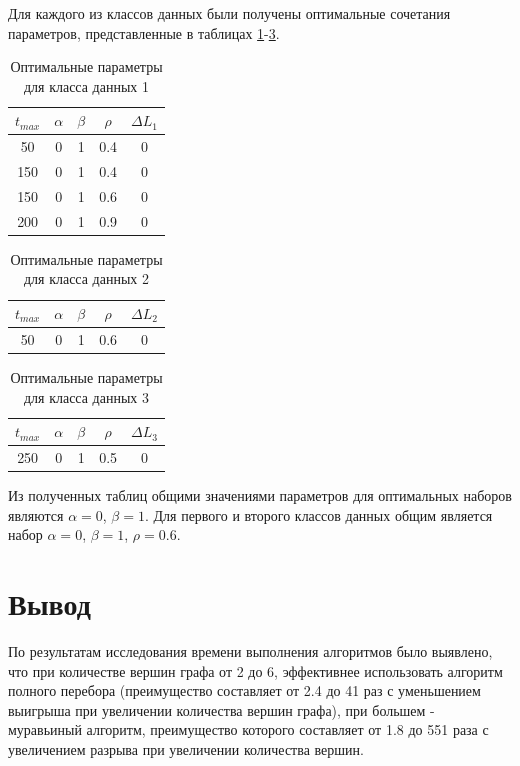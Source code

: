 \documentclass[a4paper,oneside,14pt]{extreport}
\begin{document}
Для каждого из классов данных были получены оптимальные сочетания параметров, представленные в таблицах \ref{tab:m1}-\ref{tab:m3}.

\begin{table}[H]
	\caption{Оптимальные параметры для класса данных 1}
	\label{tab:m1}
	\begin{center}
		\begin{tabular}{|c|c|c|c|c|}
			\hline
			$t_{max}$ & $\alpha$ & $\beta$ & $\rho$ & $\Delta L_{1}$\\
			\hline
			50&0&1&0.4&0\\
			150&0&1&0.4&0\\
			150&0&1&0.6&0\\
			200&0&1&0.9&0\\
			\hline
		\end{tabular}
	\end{center}
\end{table} 
\begin{table}[H]
\caption{Оптимальные параметры для класса данных 2}
\label{tab:m2}
\begin{center}
	\begin{tabular}{|c|c|c|c|c|}
		\hline
		$t_{max}$ & $\alpha$ & $\beta$ & $\rho$ & $\Delta L_{2}$\\
		\hline
		50&0&1&0.6&0\\
		\hline
	\end{tabular}
\end{center}
\end{table} 
\begin{table}[H]
\caption{Оптимальные параметры для класса данных 3}
\label{tab:m3}
\begin{center}
	\begin{tabular}{|c|c|c|c|c|}
		\hline
		$t_{max}$ & $\alpha$ & $\beta$ & $\rho$ & $\Delta L_{3}$ \\
		\hline
		250&0&1&0.5&0\\
		\hline
	\end{tabular}
\end{center}
\end{table} 

Из полученных таблиц общими значениями параметров для оптимальных наборов являются $\alpha = 0$, $\beta = 1$. Для первого и второго классов данных общим является набор $\alpha = 0$, $\beta = 1$, $\rho = 0.6$.

\section*{Вывод}
По результатам исследования времени выполнения алгоритмов было выявлено, что при количестве вершин графа от 2 до 6, эффективнее использовать алгоритм полного перебора (преимущество составляет от 2.4 до 41 раз с уменьшением выигрыша при увеличении количества вершин графа), при большем - муравьиный алгоритм, преимущество которого составляет от 1.8 до 551 раза с увеличением разрыва при увеличении количества вершин.
\end{document}
